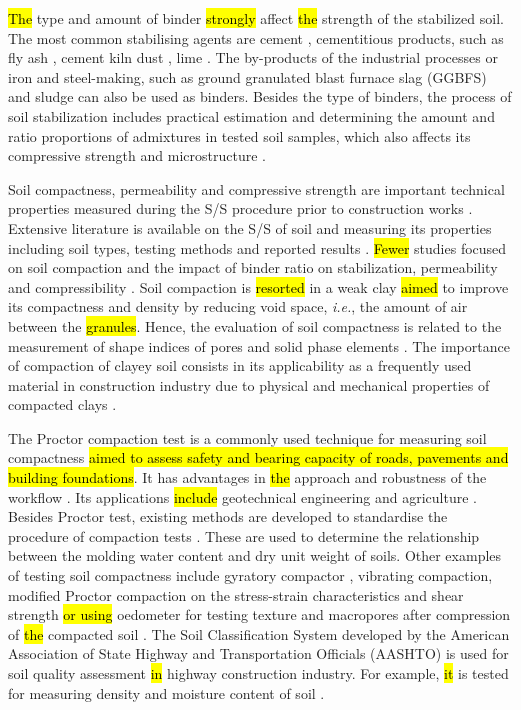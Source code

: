 \documentclass{amestyle}
\begin{document}
\hl{The} type and amount of binder \hl{strongly} affect \hl{the} strength of the stabilized soil. The most common stabilising agents are cement \cite{Rekik}, cementitious products, such as fly ash \cite{Tastan,Hasan}, cement kiln dust \cite{Solanki,Lindh2021a}, lime \cite{ARULRAJAH2017999,BIAN20211124,ANDAVAN20201125,INDIRAMMA2020694}. The by-products of the industrial processes or iron and steel-making, such as ground granulated blast furnace slag (GGBFS) \cite{Mozejko} and sludge \cite{Ingunza,Sharif} can also be used as binders. Besides the type of binders, the process of soil stabilization includes practical estimation and determining the amount and ratio proportions of admixtures in tested soil samples, which also affects its compressive strength and microstructure \cite{Lindh2001,Ahmed}.

Soil compactness, permeability and compressive strength are important technical properties measured during the S/S procedure prior to construction works \cite{LindhWinter,XU2021114774}. Extensive literature is available on the S/S of soil and measuring its properties including soil types, testing methods and reported results \cite{Anagnostopoulos,Kallenetal2016,Lemenkov2021a,HUANG2022115452}. \hl{Fewer} studies focused on soil compaction and the impact of binder ratio on stabilization, permeability and compressibility\hl{ }\cite{Kongkitkul,Leeetal2007}. Soil compaction is \hl{resorted} in a weak clay \hl{aimed} to improve its compactness and density by reducing void space, \emph{i.e.}, the amount of air between the \hl{granules}. Hence, the evaluation of soil compactness is related to the measurement of shape indices of pores and solid phase elements \cite{Bryk}. The importance of compaction of clayey soil consists in its applicability as a frequently used material in construction industry\hl{ }due to physical and mechanical properties of compacted clays \cite{Zou}. 

The Proctor compaction test is a commonly used technique for measuring soil compactness \hl{aimed to assess safety and bearing capacity of roads, pavements and building foundations}. It has advantages in \hl{the} approach and robustness of the workflow\hl{ }\cite{Wasman,Matteo,Boudlal}. Its applications \hl{include} geotechnical engineering \cite{Barden,Jibon} and agriculture \cite{ARAGON2000197,Bayat,Nhantumbo,ALAOUI20111}. Besides Proctor test, existing methods are developed to standardise the procedure of compaction tests\hl{ }\cite{ASTM2007,ASTM2009}. These are used to determine the relationship between the molding water content and dry unit weight of soils. Other examples of testing soil compactness include\hl{ }gyratory compactor \cite{Leeetal2007}, vibrating compaction, modified Proctor compaction on the stress-strain characteristics and shear strength \cite{Long} \hl{or using} oedometer for testing texture and macropores after\hl{ }compression of \hl{the} compacted soil \cite{Alaoui}. The Soil Classification System developed by the American Association of State Highway and Transportation Officials (AASHTO) is used\hl{ }for soil quality assessment \hl{in} highway construction industry. For example, \hl{it} is tested for measuring density and\hl{ }moisture content of\hl{ }soil \cite{Livneh}. 
\end{document}
